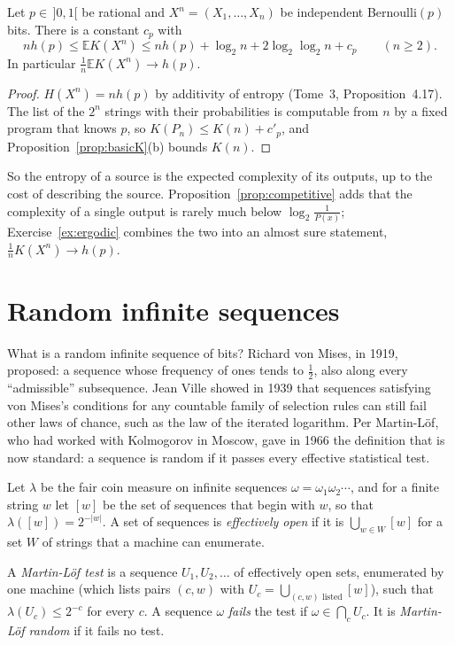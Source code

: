 \begin{corollary}\label{cor:bernoulliK}
Let $p\in\,]0,1[$ be rational and $X^n=(X_1,\dots,X_n)$ be independent Bernoulli$(p)$ bits. There is a constant $c_p$ with
\[
nh(p)\le\mathbb EK(X^n)\le nh(p)+\log_2n+2\log_2\log_2n+c_p\qquad(n\ge2).
\]
In particular $\frac1n\mathbb EK(X^n)\to h(p)$.
\end{corollary}

\begin{proof}
$H(X^n)=nh(p)$ by additivity of entropy (Tome~3, Proposition~4.17). The list of the $2^n$ strings with their probabilities is computable from $n$ by a fixed program that knows $p$, so $K(P_n)\le K(n)+c'_p$, and Proposition~\ref{prop:basicK}(b) bounds $K(n)$.
\end{proof}

So the entropy of a source is the expected complexity of its outputs, up to the cost of describing the source. Proposition~\ref{prop:competitive} adds that the complexity of a single output is rarely much below $\log_2\frac1{P(x)}$; Exercise~\ref{ex:ergodic} combines the two into an almost sure statement, $\frac1nK(X^n)\to h(p)$.

\section{Random infinite sequences}\label{sec:mlrandom}

What is a random infinite sequence of bits? Richard von Mises, in 1919, proposed: a sequence whose frequency of ones tends to $\frac12$, also along every ``admissible'' subsequence. Jean Ville showed in 1939 that sequences satisfying von Mises's conditions for any countable family of selection rules can still fail other laws of chance, such as the law of the iterated logarithm. Per Martin-Löf, who had worked with Kolmogorov in Moscow, gave in 1966 the definition that is now standard: a sequence is random if it passes every effective statistical test.

Let $\lambda$ be the fair coin measure on infinite sequences $\omega=\omega_1\omega_2\cdots$, and for a finite string $w$ let $[w]$ be the set of sequences that begin with $w$, so that $\lambda([w])=2^{-|w|}$. A set of sequences is \emph{effectively open} if it is $\bigcup_{w\in W}[w]$ for a set $W$ of strings that a machine can enumerate.

\begin{definition}\label{def:mltest}
A \emph{Martin-Löf test} is a sequence $U_1,U_2,\dots$ of effectively open sets, enumerated by one machine (which lists pairs $(c,w)$ with $U_c=\bigcup_{(c,w)\text{ listed}}[w]$), such that $\lambda(U_c)\le2^{-c}$ for every $c$. A sequence $\omega$ \emph{fails} the test if $\omega\in\bigcap_cU_c$. It is \emph{Martin-Löf random} if it fails no test.
\end{definition}

